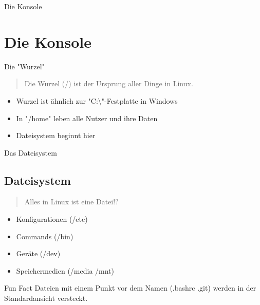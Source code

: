 
\begin{frame}{Die Konsole}
    \section{Die Konsole}\label{sec:die-konsole}
\end{frame}

\begin{frame}{Die "Wurzel"}

    \begin{quote}
        Die Wurzel (/) ist der Ursprung aller Dinge in Linux.
    \end{quote}

    \begin{itemize}
        \item Wurzel ist ähnlich zur "C:\textbackslash"-Festplatte in Windows
        \item In "/home" leben alle Nutzer und ihre Daten
        \item Dateisystem beginnt hier
    \end{itemize}

\end{frame}

\begin{frame}{Das Dateisystem}
    \subsection{Dateisystem}\label{subsec:dateisystem}

    \begin{quote}
        Alles in Linux ist eine Datei!?
    \end{quote}

    \begin{itemize}
        \item Konfigurationen (/etc)
        \item Commands (/bin)
        \item Geräte (/dev)
        \item Speichermedien (/media /mnt)
    \end{itemize}

    \vspace{0.5cm}
    \begin{exampleblock}{Fun Fact}
        Dateien mit einem Punkt vor dem Namen (.bashrc .git) werden in der Standardansicht versteckt.
    \end{exampleblock}
\end{frame}

